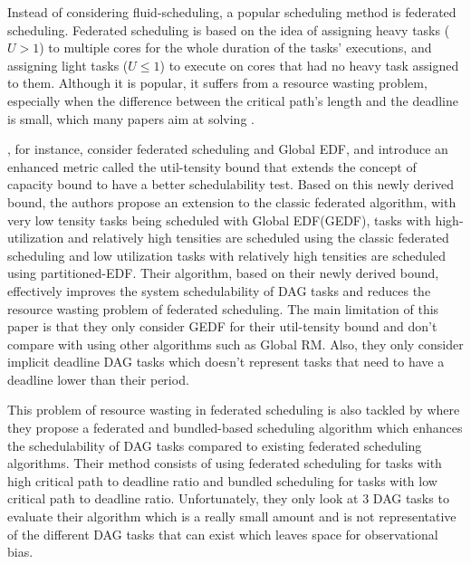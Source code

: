 Instead of considering fluid-scheduling,
a popular scheduling method is federated scheduling.
Federated scheduling is based on the idea
of assigning heavy tasks ($U > 1$) to multiple cores
for the whole duration of the tasks' executions,
and assigning light tasks ($U \le 1$) to execute on
cores that had no heavy task assigned to them.
Although it is popular, it suffers from a resource wasting problem,
especially when the difference between the critical path's length 
and the deadline is small,
which many papers aim at solving
\cite{Guan2023FederatedNew}
\cite{jiangUtilTensityBound}
\cite{JiangVirtuallyFederatedSched2021}
\cite{Jiang2023SchedVirtualProcs}
\cite{Kobayashi2023FedBundledDagsched}
\cite{He2023DegreeOfParallelism}.

\citet{jiangUtilTensityBound}, for instance, 
consider federated scheduling and Global EDF,
and introduce an enhanced metric called the util-tensity bound
that extends the concept of capacity bound
to have a better schedulability test.
Based on this newly derived bound, the authors 
propose an extension to the classic federated algorithm,
with very low tensity tasks being scheduled with Global EDF(GEDF), 
tasks with high-utilization and relatively high tensities are scheduled
using the classic federated scheduling and low utilization
tasks with relatively high tensities are scheduled using partitioned-EDF.
Their algorithm, based on their newly derived bound, effectively improves
the system schedulability of DAG tasks and reduces the resource wasting 
problem of federated scheduling. The main limitation
of this paper is that they only consider GEDF 
for their util-tensity bound and
don't compare with using other algorithms such as Global RM.
Also, they only consider implicit deadline DAG tasks
which doesn't represent tasks that need to have a deadline 
lower than their period.

This problem of resource wasting in federated scheduling
is also tackled by \citet{Kobayashi2023FedBundledDagsched}
where they propose a federated and bundled-based scheduling
algorithm which enhances the schedulability of DAG tasks
compared to existing federated scheduling algorithms.
Their method consists of using federated scheduling for
tasks with high critical path to deadline ratio and bundled
scheduling for tasks with low critical path to deadline ratio.
Unfortunately, they only look at 3 DAG tasks to evaluate
their algorithm which is a really small amount and is not 
representative of the different DAG tasks that can exist
which leaves space for observational bias.

